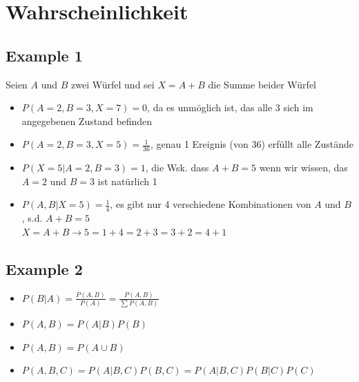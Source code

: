 \documentclass[12pt,a4paper]{article}
\begin{document}
\section{Wahrscheinlichkeit}
\subsection{Example 1}
Seien $A$ und $B$ zwei Würfel und sei $X=A+B$ die Summe beider Würfel
\begin{itemize}
\item $P(A=2,B=3,X=7) = 0$, da es unmöglich ist, das alle 3 sich im angegebenen Zustand befinden
\item $P(A=2,B=3,X=5) = \frac{1}{36}$, genau 1 Ereignis (von 36) erfüllt alle Zustände
\item $P(X=5|A=2, B=3) = 1$, die Wsk. dass $A+B =5$ wenn wir wissen, das $A=2$ und $B=3$ ist natürlich 1
\item $P(A,B|X=5) = \frac{1}{4}$, es gibt nur 4 verschiedene Kombinationen von $A$ und $B$, s.d. $A+B=5$\\
$X=A+B \rightarrow 5=1+4=2+3=3+2=4+1$
\end{itemize}
\subsection{Example 2}
\begin{itemize}
\item $P(B|A)=\frac{P(A,B)}{P(A)}=\frac{P(A,B)}{\sum P(A,B)}$
\item $P(A,B)=P(A|B)P(B)$
\item $P(A,B)=P(A\cup B)$
\item $P(A,B,C) = P(A|B,C)P(B,C)=P(A|B,C)P(B|C)P(C)$
\end{itemize}
\end{document}
